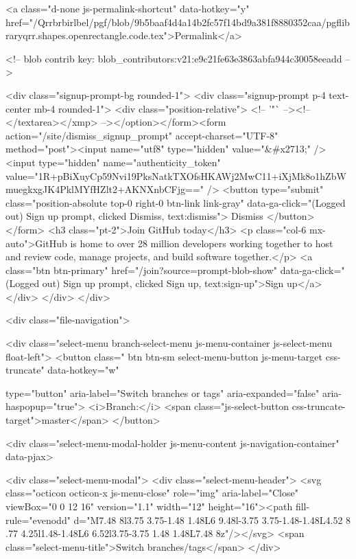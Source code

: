   
    <a class="d-none js-permalink-shortcut" data-hotkey="y" href="/Qrrbrbirlbel/pgf/blob/9b5baaf4d4a14b2fc57f14bd9a381f8880352caa/pgflibraryqrr.shapes.openrectangle.code.tex">Permalink</a>

    <!-- blob contrib key: blob_contributors:v21:e9c21fe63e3863abfa944c30058eeadd -->

        <div class="signup-prompt-bg rounded-1">
      <div class="signup-prompt p-4 text-center mb-4 rounded-1">
        <div class="position-relative">
          <!-- '"` --><!-- </textarea></xmp> --></option></form><form action="/site/dismiss_signup_prompt" accept-charset="UTF-8" method="post"><input name="utf8" type="hidden" value="&#x2713;" /><input type="hidden" name="authenticity_token" value="1R+pBiXuyCp59Nvi19PksNatkTXOfsHKAWj2MwC11+iXjMk8o1hZbWmuegkxgJK4PklMYfHZlt2+AKNXnbCFjg==" />
            <button type="submit" class="position-absolute top-0 right-0 btn-link link-gray" data-ga-click="(Logged out) Sign up prompt, clicked Dismiss, text:dismiss">
              Dismiss
            </button>
</form>          <h3 class="pt-2">Join GitHub today</h3>
          <p class="col-6 mx-auto">GitHub is home to over 28 million developers working together to host and review code, manage projects, and build software together.</p>
          <a class="btn btn-primary" href="/join?source=prompt-blob-show" data-ga-click="(Logged out) Sign up prompt, clicked Sign up, text:sign-up">Sign up</a>
        </div>
      </div>
    </div>


    <div class="file-navigation">
      
<div class="select-menu branch-select-menu js-menu-container js-select-menu float-left">
  <button class=" btn btn-sm select-menu-button js-menu-target css-truncate" data-hotkey="w"
    
    type="button" aria-label="Switch branches or tags" aria-expanded="false" aria-haspopup="true">
      <i>Branch:</i>
      <span class="js-select-button css-truncate-target">master</span>
  </button>

  <div class="select-menu-modal-holder js-menu-content js-navigation-container" data-pjax>

    <div class="select-menu-modal">
      <div class="select-menu-header">
        <svg class="octicon octicon-x js-menu-close" role="img" aria-label="Close" viewBox="0 0 12 16" version="1.1" width="12" height="16"><path fill-rule="evenodd" d="M7.48 8l3.75 3.75-1.48 1.48L6 9.48l-3.75 3.75-1.48-1.48L4.52 8 .77 4.25l1.48-1.48L6 6.52l3.75-3.75 1.48 1.48L7.48 8z"/></svg>
        <span class="select-menu-title">Switch branches/tags</span>
      </div>

